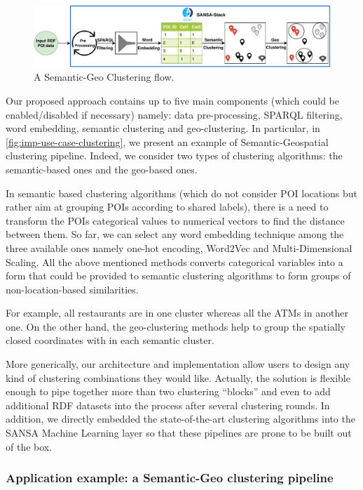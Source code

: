 \begin{figure}
    \centering
	\includegraphics[width=\textwidth]{images/7_implemenation_and_usecases/KmeansPaper8.pdf}
	\caption{A Semantic-Geo Clustering flow.}
	\label{fig:imp-use-case-clustering}
\end{figure}

Our proposed approach contains up to five main components (which could be enabled/disabled if necessary) namely: data pre-processing, SPARQL filtering, word embedding, semantic clustering and geo-clustering.
In particular, in \autoref{fig:imp-use-case-clustering}, we present an example of Semantic-Geospatial clustering pipeline.
Indeed, we consider two types of clustering algorithms: the semantic-based ones and the geo-based ones.

In semantic based clustering algorithms (which do not consider POI locations but rather aim at grouping POIs according to shared labels), there is a need to transform the POIs categorical values to numerical vectors to find the distance between them. 
So far, we can select any word embedding technique among the three available ones namely one-hot encoding, Word2Vec and Multi-Dimensional Scaling.
All the above mentioned methods converts categorical variables into a form that could be provided to semantic clustering algorithms to form groups of non-location-based similarities.

For example, all restaurants are in one cluster whereas all the ATMs in another one.
On the other hand, the geo-clustering methods help to group the spatially closed coordinates with in each semantic cluster.

More generically, our architecture and implementation allow users to design any kind of clustering combinations they would like. Actually, the solution is flexible enough to pipe together more than two clustering ``blocks'' and even to add additional RDF datasets into the process after several clustering rounds. In addition, we directly embedded the state-of-the-art clustering algorithms into the SANSA Machine Learning layer so that these pipelines are prone to be built out of the box.


\subsubsection{Application example: a Semantic-Geo clustering pipeline}

